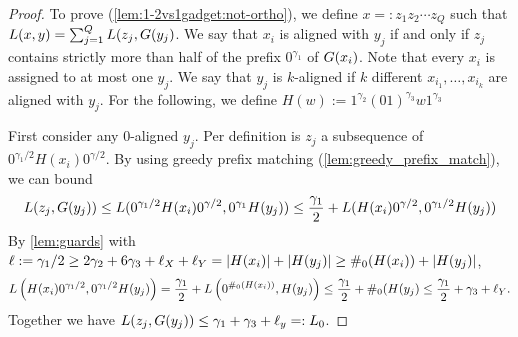 \begin{proof}
%



To prove (\ref{lem:1-2vs1gadget:not-ortho}), we define $x =: z_1z_2 \cdots z_Q$ such that $L(x,y) = \sum_{j=1}^Q L(z_j, G(y_j)$.
We say that $x_i$ is aligned with $y_j$ if and only if $z_j$ contains strictly more than half of the prefix $0^{\gamma_1}$ of $G(x_i)$.
Note that every $x_i$ is assigned to at most one $y_j$.
We say that $y_j$ is $k$-aligned if $k$ different $x_{i_1}, \ldots, x_{i_k}$ are aligned with $y_j$.
For the following, we define $H(w) := 1^{\gamma_2}(01)^{\gamma_3}w1^{\gamma_3}$

First consider any $0$-aligned $y_j$.
Per definition is $z_j$ a subsequence of $0^{\gamma_1 / 2}H(x_i)0^{\gamma / 2}$.
By using greedy prefix matching (\autoref{lem:greedy_prefix_match}), we can bound
\[
	L(z_j,G(y_j)) \leq L(0^{\gamma_1 / 2}H(x_i)0^{\gamma / 2}, 0^{\gamma_1}H(y_j)) \leq \frac{\gamma_1}{2} + L(H(x_i)0^{\gamma / 2}, 0^{\gamma_1 / 2}H(y_j))
\]
By \autoref{lem:guards} with $\ell := \gamma_{1}/2 \geq 2\gamma_{2} + 6\gamma_{3} + \ell_{X} + \ell_{Y}
= |H(x_{i})| + |H(y_{j})| \geq \#_{0}(H(x_{i})) + |H(y_{j})|$, 
\[
L\left(H(x_{i})0^{\gamma_{1}/2}, 0^{\gamma_{1}/2}H(y_{j})\right)
= \frac{\gamma_{1}}{2} + L\left(0^{\#_{0}(H(x_{i}))}, H(y_{j})\right)
\leq \frac{\gamma_{1}}{2} + \#_{0}(H(y_{j}) 
\leq \frac{\gamma_{1}}{2} + \gamma_{3} + \ell_{Y}.
\]
Together we have $L(z_j,G(y_j)) \leq \gamma_1 + \gamma_3 + \ell_y =: L_0$.


\end{proof}
